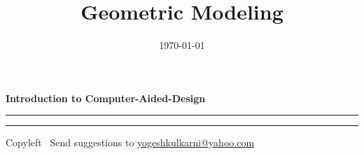 
\graphicspath{{images/}}
\usepackage{beamerarticle}
\usepackage{listings}
%
%


\title[Intro to CAD \hspace{4cm} \insertframenumber /\inserttotalframenumber]{Geometric Modeling}  
\subtitle[]{}
\date[2014]{\today} 






\raggedright
\footnotesize
\begin{center}
     \Large{\textbf{Introduction to Computer-Aided-Design}}  
\end{center}
\rule{\linewidth}{0.25pt}

\begin{multicols}{3}




\rule{\linewidth}{0.25pt}
\scriptsize
Copyleft \textcopyleft\  Send suggestions to 
\href{http://www.yogeshkulkarni.com}{yogeshkulkarni@yahoo.com}


\end{multicols}





